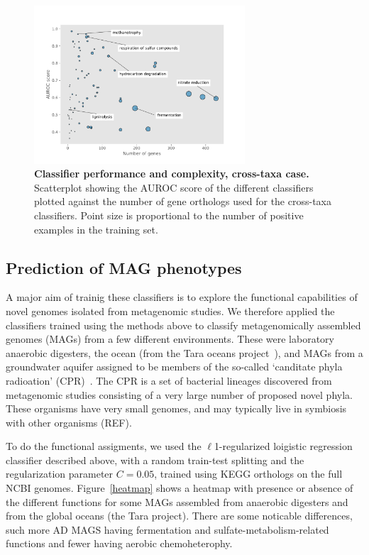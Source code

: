 \documentclass[10pt,letterpaper]{article}
\begin{document}
\begin{figure}
\includegraphics[width=0.7\textwidth]{fig6}
\caption{{\bf Classifier performance and complexity, cross-taxa case.}
Scatterplot showing the AUROC score of the different classifiers plotted against the number of gene orthologs used for the cross-taxa classifiers. Point size is proportional to the number of positive examples in the training set.}
\label{fig6}
\end{figure}

\subsection*{Prediction of MAG phenotypes}
A major aim of trainig these classifiers is to explore the functional capabilities of novel genomes isolated from metagenomic studies. We therefore applied the classifiers trained using the methods above to classify metagenomically assembled genomes (MAGs) from a few different environments. These were laboratory anaerobic digesters, the ocean (from the Tara oceans project~\cite{Zhang2015}), and MAGs from a groundwater aquifer assigned to be members of the so-called `canditate phyla radioation' (CPR)~\cite{Anantharaman2016}. The CPR is a set of bacterial lineages discovered from metagenomic studies consisting of a very large number of proposed novel phyla. These organisms have very small genomes, and may typically live in symbiosis with other organisms (REF).

To do the functional assigments, we used the $\ell$1-regularized loigistic regression classifier described above, with a random train-test splitting and the regularization parameter $C=0.05$, trained using KEGG orthologs on the full NCBI genomes. Figure~\ref{heatmap} shows a heatmap with presence or absence of the different functions for some MAGs assembled from anaerobic digesters and from the global oceans (the Tara project). There are some noticable differences, such more AD MAGS having fermentation and sulfate-metabolism-related functions and fewer having aerobic chemoheterophy. 
\end{document}
